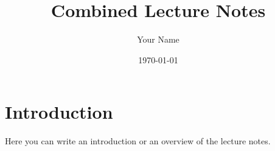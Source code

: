 \documentclass{article}
\title{Combined Lecture Notes}
\author{Your Name}
\date{\today}
\begin{document}
\maketitle
\tableofcontents

\section{Introduction}\label{sec:introduction}
Here you can write an introduction or an overview of the lecture notes.




\end{document}
